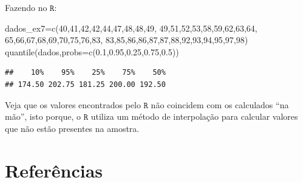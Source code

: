 \documentclass[
]{book}
\newenvironment{Shaded}{\begin{snugshade}}{\end{snugshade}}
\newcommand{\AttributeTok}[1]{\textcolor[rgb]{0.77,0.63,0.00}{#1}}
\newcommand{\DecValTok}[1]{\textcolor[rgb]{0.00,0.00,0.81}{#1}}
\newcommand{\FloatTok}[1]{\textcolor[rgb]{0.00,0.00,0.81}{#1}}
\newcommand{\FunctionTok}[1]{\textcolor[rgb]{0.00,0.00,0.00}{#1}}
\newcommand{\NormalTok}[1]{#1}
\newcommand{\OtherTok}[1]{\textcolor[rgb]{0.56,0.35,0.01}{#1}}
\begin{document}
Fazendo no \(\texttt{R}\):

\begin{Shaded}
\begin{Highlighting}[]
\NormalTok{dados\_ex7}\OtherTok{=}\FunctionTok{c}\NormalTok{(}\DecValTok{40}\NormalTok{,}\DecValTok{41}\NormalTok{,}\DecValTok{42}\NormalTok{,}\DecValTok{42}\NormalTok{,}\DecValTok{44}\NormalTok{,}\DecValTok{47}\NormalTok{,}\DecValTok{48}\NormalTok{,}\DecValTok{48}\NormalTok{,}\DecValTok{49}\NormalTok{,}
            \DecValTok{49}\NormalTok{,}\DecValTok{51}\NormalTok{,}\DecValTok{52}\NormalTok{,}\DecValTok{53}\NormalTok{,}\DecValTok{58}\NormalTok{,}\DecValTok{59}\NormalTok{,}\DecValTok{62}\NormalTok{,}\DecValTok{63}\NormalTok{,}\DecValTok{64}\NormalTok{,}
            \DecValTok{65}\NormalTok{,}\DecValTok{66}\NormalTok{,}\DecValTok{67}\NormalTok{,}\DecValTok{68}\NormalTok{,}\DecValTok{69}\NormalTok{,}\DecValTok{70}\NormalTok{,}\DecValTok{75}\NormalTok{,}\DecValTok{76}\NormalTok{,}\DecValTok{83}\NormalTok{,}
            \DecValTok{83}\NormalTok{,}\DecValTok{85}\NormalTok{,}\DecValTok{86}\NormalTok{,}\DecValTok{86}\NormalTok{,}\DecValTok{87}\NormalTok{,}\DecValTok{87}\NormalTok{,}\DecValTok{88}\NormalTok{,}\DecValTok{92}\NormalTok{,}\DecValTok{93}\NormalTok{,}\DecValTok{94}\NormalTok{,}\DecValTok{95}\NormalTok{,}\DecValTok{97}\NormalTok{,}\DecValTok{98}\NormalTok{)}
\FunctionTok{quantile}\NormalTok{(dados,}\AttributeTok{probs=}\FunctionTok{c}\NormalTok{(}\FloatTok{0.1}\NormalTok{,}\FloatTok{0.95}\NormalTok{,}\FloatTok{0.25}\NormalTok{,}\FloatTok{0.75}\NormalTok{,}\FloatTok{0.5}\NormalTok{))}
\end{Highlighting}
\end{Shaded}

\begin{verbatim}
##    10%    95%    25%    75%    50% 
## 174.50 202.75 181.25 200.00 192.50
\end{verbatim}

Veja que os valores encontrados pelo \(\texttt{R}\) não coincidem com os calculados ``na mão'', isto porque, o \(\texttt{R}\) utiliza um método de interpolação para calcular valores que não estão presentes na amostra.

\hypertarget{referuxeancias}{%
\section{Referências}\label{referuxeancias}}

  
\end{document}
